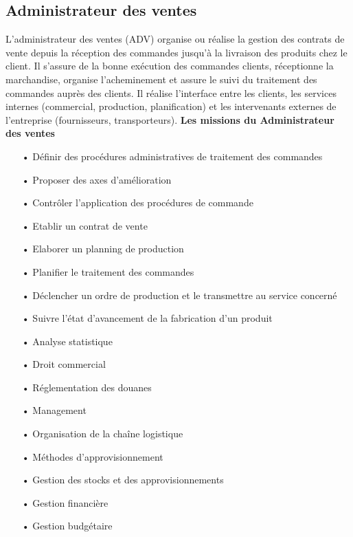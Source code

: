\documentclass[edit,12pt,a4paper,ChapStyle,oneside,doubleinterligne]{report}
\begin{document}
\subsection{Administrateur des ventes}
L’administrateur des ventes (ADV) organise ou réalise la gestion des contrats de vente depuis la réception des commandes jusqu'à la livraison des produits chez le client. Il s’assure de la bonne exécution des commandes clients, réceptionne la marchandise, organise l’acheminement et assure le suivi du traitement des commandes auprès des clients. Il réalise l'interface entre les clients, les services internes (commercial, production, planification) et les intervenants externes de l'entreprise (fournisseurs, transporteurs)\cite{Administrateur}.
\newline\textbf{Les missions du  Administrateur des ventes}\newline
\begin{itemize}
    \item [•] Définir des procédures administratives de traitement des commandes 
    \item [•] Proposer des axes d'amélioration 
    \item [•] Contrôler l'application des procédures de commande 
    \item [•] Etablir un contrat de vente 
    \item [•] Elaborer un planning de production
    \item [•] Planifier le traitement des commandes 
    \item [•] Déclencher un ordre de production et le transmettre au service concerné 
    \item [•] Suivre l'état d'avancement de la fabrication d'un produit 
    \item [•] Analyse statistique
    \item [•] Droit commercial
    \item [•] Réglementation des douanes
    \item [•] Management
    \item [•] Organisation de la chaîne logistique
    \item [•] Méthodes d'approvisionnement
    \item [•] Gestion des stocks et des approvisionnements
    \item [•] Gestion financière
    \item [•] Gestion budgétaire
\end{itemize}
\end{document}
